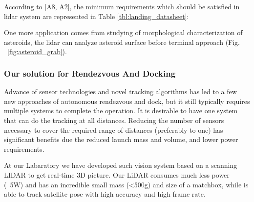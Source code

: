 According to [A8, A2], the minimum requirements which should be satisfied in lidar system are represented in Table \ref{tbl:landing_datasheet}:



\begin{figure}[h]
\begin{floatrow}
\end{floatrow}
\end{figure}


One more application comes from studying of morphological characterization of asteroids, the lidar can analyze asteroid surface before terminal approach (Fig. ~\ref{fig:asteroid_grab}).


\subsubsection{Our solution for Rendezvous And Docking}
Advance of sensor technologies and novel tracking algorithms has led to a few new approaches of autonomous rendezvous and dock,
but it still typically requires multiple systems to complete the operation. It is desirable to have one system that can do the tracking at all distances. 
Reducing the number of sensors necessary to cover the required range of distances (preferably to one) has significant
benefits due the reduced launch mass and volume, and lower power requirements.

At our Labaratory we have developed such vision system based on a scanning LIDAR to get real-time 3D picture.
Our LiDAR consumes much less power (~5W) and has an incredible small mass (<500g) and size of a matchbox, while is able to track satellite pose with high accuracy and high frame rate.





